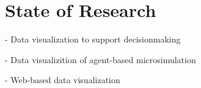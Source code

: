 
\hypertarget{state-of-research-main}{%
\section{State of Research}
\label{research-main}}

- Data visualization to support decisionmaking

- Data visualizition of agent-based microsimulation

- Web-based data visualization


